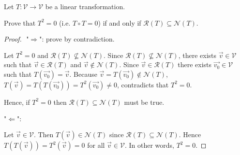\documentclass{article}
\begin{document}
\begin{itshape}
Let $T: \mathcal{V} \to \mathcal{V}$ be a linear transformation.

Prove that $T^2=0$ (i.e. $T \circ T =0$) if and only if $\mathcal{R}(T) \subseteq \mathcal{N}(T)$.
\end{itshape}
\medskip

\begin{proof}
$ $\newline
"$\Rightarrow$": prove by contradiction. 

Let $T^2 = 0$ and $ \mathcal{R}(T) \not\subseteq \mathcal{N}(T)$. Since $ \mathcal{R}(T) \not\subseteq \mathcal{N}(T)$, there exists $\vec{v} \in \mathcal{V}$ such that $\vec{v} \in \mathcal{R}(T)$ and $\vec{v} \notin \mathcal{N}(T)$. Since $\vec{v} \in \mathcal{R}(T)$ there exists $\vec{v_0} \in \mathcal{V}$ such that $T(\vec{v_0}) = \vec{v}$. Because $\vec{v} = T(\vec{v_0}) \notin \mathcal{N}(T)$, $T(\vec{v}) = T(T(\vec{v_0})) = T^2(\vec{v_0}) \ne 0$, contradicts that $T^2 =0$.

Hence, if $T^2=0$ then $\mathcal{R}(T) \subseteq \mathcal{N}(T)$ must be true.
\bigskip

"$\Leftarrow$":

Let $\vec{v} \in \mathcal{V}$. Then $T(\vec{v}) \in \mathcal{N}(T)$ since $\mathcal{R}(T) \subseteq \mathcal{N}(T)$. Hence $T(T(\vec{v})) = T^2(\vec{v}) = 0$ for all $\vec{v} \in \mathcal{V}$. In other words, $T^2 = 0$.
\end{proof}
\end{document}
